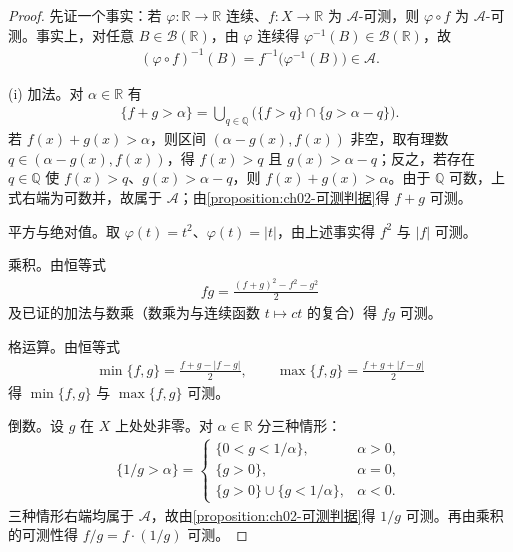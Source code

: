 \documentclass[../../main.tex]{subfiles}%
\begin{document}
\begin{proof}
先证一个事实：若 $\varphi:\mathbb{R}\to\mathbb{R}$ 连续、$f:X\to\mathbb{R}$ 为 $\mathscr A$-可测，则 $\varphi\circ f$ 为 $\mathscr A$-可测。事实上，对任意 $B\in\mathscr B(\mathbb{R})$，由 $\varphi$ 连续得 $\varphi^{-1}(B)\in\mathscr B(\mathbb{R})$，故
\begin{align*}
(\varphi\circ f)^{-1}(B)=f^{-1}\bigl(\varphi^{-1}(B)\bigr)\in\mathscr A.
\end{align*}

(i) 加法。对 $\alpha\in\mathbb{R}$ 有
\begin{align*}
\{f+g>\alpha\}=\bigcup_{q\in\mathbb{Q}}\bigl(\{f>q\}\cap\{g>\alpha-q\}\bigr).
\end{align*}
若 $f(x)+g(x)>\alpha$，则区间 $(\alpha-g(x),f(x))$ 非空，取有理数 $q\in(\alpha-g(x),f(x))$，得 $f(x)>q$ 且 $g(x)>\alpha-q$；反之，若存在 $q\in\mathbb{Q}$ 使 $f(x)>q$、$g(x)>\alpha-q$，则 $f(x)+g(x)>\alpha$。由于 $\mathbb{Q}$ 可数，上式右端为可数并，故属于 $\mathscr A$；由\cref{proposition:ch02-可测判据}得 $f+g$ 可测。

平方与绝对值。取 $\varphi(t)=t^2$、$\varphi(t)=|t|$，由上述事实得 $f^2$ 与 $|f|$ 可测。

乘积。由恒等式
\begin{align*}
fg=\frac{(f+g)^2-f^2-g^2}{2}
\end{align*}
及已证的加法与数乘（数乘为与连续函数 $t\mapsto ct$ 的复合）得 $fg$ 可测。

格运算。由恒等式
\begin{align*}
\min\{f,g\}=\frac{f+g-|f-g|}{2},\qquad
\max\{f,g\}=\frac{f+g+|f-g|}{2}
\end{align*}
得 $\min\{f,g\}$ 与 $\max\{f,g\}$ 可测。

倒数。设 $g$ 在 $X$ 上处处非零。对 $\alpha\in\mathbb{R}$ 分三种情形：
\begin{align*}
\{1/g>\alpha\}=
\begin{cases}
\{0<g<1/\alpha\}, & \alpha>0,\\
\{g>0\}, & \alpha=0,\\
\{g>0\}\cup\{g<1/\alpha\}, & \alpha<0.
\end{cases}
\end{align*}
三种情形右端均属于 $\mathscr A$，故由\cref{proposition:ch02-可测判据}得 $1/g$ 可测。再由乘积的可测性得 $f/g=f\cdot(1/g)$ 可测。


\end{proof}
\end{document}
